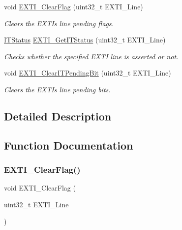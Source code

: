 \begin{DoxyCompactItemize}
void \hyperlink{group___e_x_t_i___exported___functions_ga8e07aaaa286dea4803605d5968850a92}{E\+X\+T\+I\+\_\+\+Clear\+Flag} (uint32\+\_\+t E\+X\+T\+I\+\_\+\+Line)
\begin{DoxyCompactList}\small\item\em Clears the E\+X\+TI\textquotesingle{}s line pending flags. \end{DoxyCompactList}\item 
\hyperlink{group___exported__types_gaacbd7ed539db0aacd973a0f6eca34074}{I\+T\+Status} \hyperlink{group___e_x_t_i___exported___functions_gaf7b51519062ae42fd27ee689cab364aa}{E\+X\+T\+I\+\_\+\+Get\+I\+T\+Status} (uint32\+\_\+t E\+X\+T\+I\+\_\+\+Line)
\begin{DoxyCompactList}\small\item\em Checks whether the specified E\+X\+TI line is asserted or not. \end{DoxyCompactList}\item 
void \hyperlink{group___e_x_t_i___exported___functions_ga3652a7e682728b310c124e7e974d1468}{E\+X\+T\+I\+\_\+\+Clear\+I\+T\+Pending\+Bit} (uint32\+\_\+t E\+X\+T\+I\+\_\+\+Line)
\begin{DoxyCompactList}\small\item\em Clears the E\+X\+TI\textquotesingle{}s line pending bits. \end{DoxyCompactList}\end{DoxyCompactItemize}


\subsection{Detailed Description}


\subsection{Function Documentation}
\mbox{\label{group___e_x_t_i___exported___functions_ga8e07aaaa286dea4803605d5968850a92}} 
\subsubsection{\texorpdfstring{E\+X\+T\+I\+\_\+\+Clear\+Flag()}{EXTI\_ClearFlag()}}
{\footnotesize\ttfamily void E\+X\+T\+I\+\_\+\+Clear\+Flag (\begin{DoxyParamCaption}\item[{uint32\+\_\+t}]{E\+X\+T\+I\+\_\+\+Line }\end{DoxyParamCaption})}



